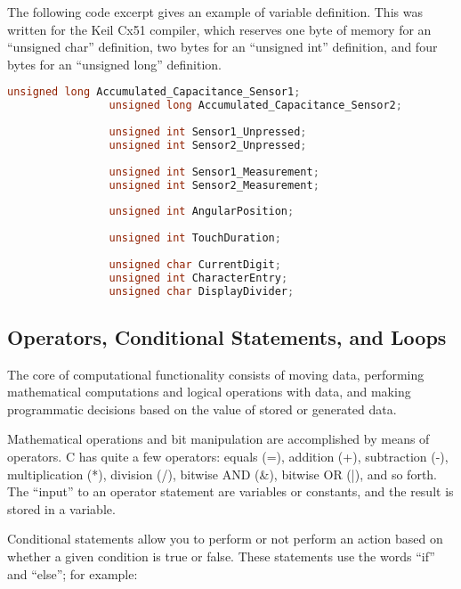             The following code excerpt gives an example of variable definition. This was written for the Keil Cx51 compiler, which reserves one byte of memory for an “unsigned char” definition, two bytes for an “unsigned int” definition, and four bytes for an “unsigned long” definition.
            
                 
                \begin{lstlisting}[backgroundcolor = \color{lightgray}, language=c]
                unsigned long Accumulated_Capacitance_Sensor1;
                unsigned long Accumulated_Capacitance_Sensor2;
                
                unsigned int Sensor1_Unpressed;
                unsigned int Sensor2_Unpressed;
                
                unsigned int Sensor1_Measurement;
                unsigned int Sensor2_Measurement;
                
                unsigned int AngularPosition;
                
                unsigned int TouchDuration;
                
                unsigned char CurrentDigit;
                unsigned int CharacterEntry;
                unsigned char DisplayDivider;
                \end{lstlisting}
                

        \subsection{Operators, Conditional Statements, and Loops} 
        
            The core of computational functionality consists of moving data, performing mathematical computations and logical operations with data, and making programmatic decisions based on the value of stored or generated data.
            
            Mathematical operations and bit manipulation are accomplished by means of operators. C has quite a few operators: equals (=), addition (+), subtraction (-), multiplication (*), division (/), bitwise AND (\&), bitwise OR (|), and so forth. The ``input'' to an operator statement are variables or constants, and the result is stored in a variable.
            
            Conditional statements allow you to perform or not perform an action based on whether a given condition is true or false. These statements use the words “if” and “else”; for example:
            
